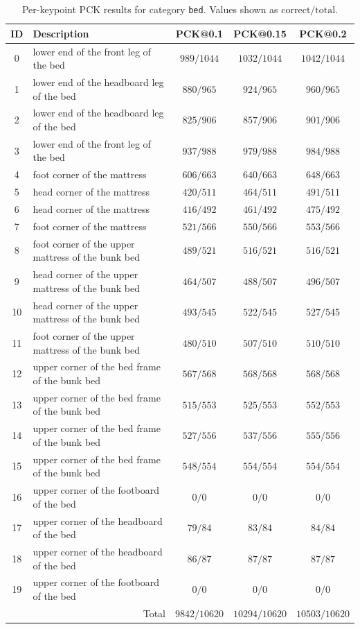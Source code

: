 \begin{table}[h]
\centering
\small
\caption{Per-keypoint PCK results for category \texttt{bed}. Values shown as $\text{correct}/\text{total}$.}
\label{tab:pck_bed}
\begin{tabular}{cl ccc}
\toprule
ID & Description & PCK@0.1 & PCK@0.15 & PCK@0.2 \\
\midrule
0 & lower end of the front leg of the bed & $989/1044$ & $1032/1044$ & $1042/1044$ \\
1 & lower end of the headboard leg of the bed & $880/965$ & $924/965$ & $960/965$ \\
2 & lower end of the headboard leg of the bed & $825/906$ & $857/906$ & $901/906$ \\
3 & lower end of the front leg of the bed & $937/988$ & $979/988$ & $984/988$ \\
4 & foot corner of the mattress & $606/663$ & $640/663$ & $648/663$ \\
5 & head corner of the mattress & $420/511$ & $464/511$ & $491/511$ \\
6 & head corner of the mattress & $416/492$ & $461/492$ & $475/492$ \\
7 & foot corner of the mattress & $521/566$ & $550/566$ & $553/566$ \\
8 & foot corner of the upper mattress of the bunk bed & $489/521$ & $516/521$ & $516/521$ \\
9 & head corner of the upper mattress of the bunk bed & $464/507$ & $488/507$ & $496/507$ \\
10 & head corner of the upper mattress of the bunk bed & $493/545$ & $522/545$ & $527/545$ \\
11 & foot corner of the upper mattress of the bunk bed & $480/510$ & $507/510$ & $510/510$ \\
12 & upper corner of the bed frame of the bunk bed & $567/568$ & $568/568$ & $568/568$ \\
13 & upper corner of the bed frame of the bunk bed & $515/553$ & $525/553$ & $552/553$ \\
14 & upper corner of the bed frame of the bunk bed & $527/556$ & $537/556$ & $555/556$ \\
15 & upper corner of the bed frame of the bunk bed & $548/554$ & $554/554$ & $554/554$ \\
16 & upper corner of the footboard of the bed & $0/0$ & $0/0$ & $0/0$ \\
17 & upper corner of the headboard of the bed & $79/84$ & $83/84$ & $84/84$ \\
18 & upper corner of the headboard of the bed & $86/87$ & $87/87$ & $87/87$ \\
19 & upper corner of the footboard of the bed & $0/0$ & $0/0$ & $0/0$ \\
\midrule
\multicolumn{2}{r}{Total} & $9842/10620$ & $10294/10620$ & $10503/10620$ \\
\bottomrule
\end{tabular}
\end{table}

